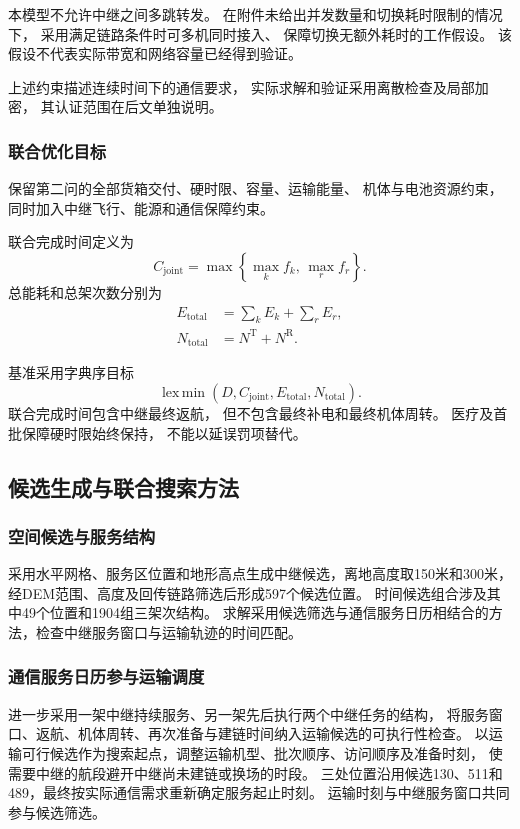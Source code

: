\documentclass[bwprint]{gmcmthesis}
\begin{document}
本模型不允许中继之间多跳转发。
在附件未给出并发数量和切换耗时限制的情况下，
采用满足链路条件时可多机同时接入、
保障切换无额外耗时的工作假设。
该假设不代表实际带宽和网络容量已经得到验证。

上述约束描述连续时间下的通信要求，
实际求解和验证采用离散检查及局部加密，
其认证范围在后文单独说明。

\subsubsection{联合优化目标}

保留第二问的全部货箱交付、硬时限、容量、运输能量、
机体与电池资源约束，
同时加入中继飞行、能源和通信保障约束。

联合完成时间定义为
\begin{equation}
    C_{\mathrm{joint}}
    =
    \max\left\{
    \max_k f_k,\,
    \max_r f_r
    \right\}.
\end{equation}
总能耗和总架次数分别为
\begin{align}
    E_{\mathrm{total}}
    &=
    \sum_k E_k+\sum_r E_r,\\
    N_{\mathrm{total}}
    &=
    N^{\mathrm{T}}+N^{\mathrm{R}}.
\end{align}

基准采用字典序目标
\begin{equation}
    \operatorname{lex\,min}
    \left(
    D,C_{\mathrm{joint}},
    E_{\mathrm{total}},N_{\mathrm{total}}
    \right).
\end{equation}
联合完成时间包含中继最终返航，
但不包含最终补电和最终机体周转。
医疗及首批保障硬时限始终保持，
不能以延误罚项替代。

\subsection{候选生成与联合搜索方法}
\subsubsection{空间候选与服务结构}
采用水平网格、服务区位置和地形高点生成中继候选，离地高度取150米和300米，
经DEM范围、高度及回传链路筛选后形成597个候选位置。
时间候选组合涉及其中49个位置和1904组三架次结构。
求解采用候选筛选与通信服务日历相结合的方法，检查中继服务窗口与运输轨迹的时间匹配。

\subsubsection{通信服务日历参与运输调度}
进一步采用一架中继持续服务、另一架先后执行两个中继任务的结构，
将服务窗口、返航、机体周转、再次准备与建链时间纳入运输候选的可执行性检查。
以运输可行候选作为搜索起点，调整运输机型、批次顺序、访问顺序及准备时刻，
使需要中继的航段避开中继尚未建链或换场的时段。
三处位置沿用候选130、511和489，最终按实际通信需求重新确定服务起止时刻。
运输时刻与中继服务窗口共同参与候选筛选。
\end{document}
